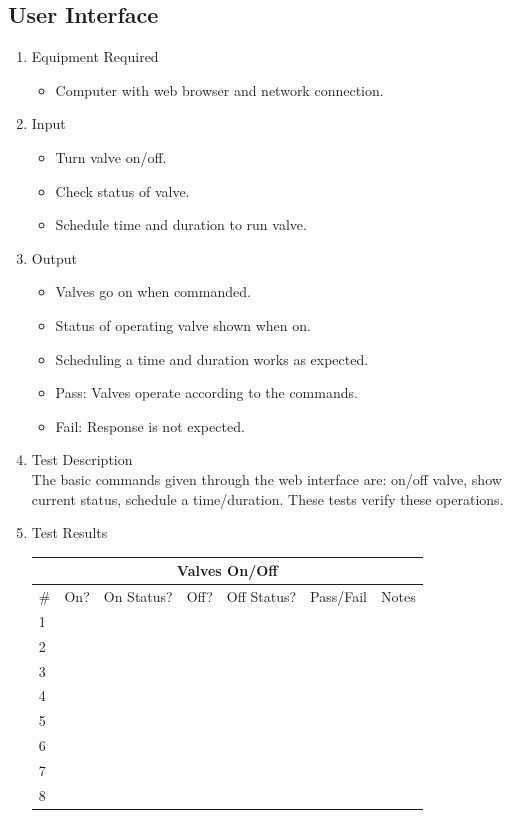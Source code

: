 \documentclass{article}
\begin{document}

\clearpage
\subsection{User Interface}

\begin{enumerate}
\item Equipment Required
	\begin{itemize}
	\item Computer with web browser and network connection.
	\end{itemize}
\item Input
	\begin{itemize}
	\item Turn valve on/off.
	\item Check status of valve.
	\item Schedule time and duration to run valve.
	\end{itemize}
\item Output
	\begin{itemize}
	\item Valves go on when commanded.
	\item Status of operating valve shown when on.
	\item Scheduling a time and duration works as expected.
	\item Pass: Valves operate according to the commands.
	\item Fail: Response is not expected.
	\end{itemize}
\item Test Description \\

The basic commands given through the web interface are:
on/off valve, show current status, schedule a time/duration.
These tests verify these operations.

\item Test Results \\
	\vspace{0.25in}
	\begin{tabular}{|l|l|l|l|l|l|c|}
		\hline
		\multicolumn{7}{|c|}{Valves On/Off} \\
		\hline
		\# & On? & On Status? & Off? & Off Status? & Pass/Fail & \hspace{0.7in}Notes\hspace{0.7in} \\
		\hline
		1 &&&&&& \\
		\hline
		2 &&&&&& \\
		\hline
		3 &&&&&& \\
		\hline
		4 &&&&&& \\
		\hline
		5 &&&&&& \\
		\hline
		6 &&&&&& \\
		\hline
		7 &&&&&& \\
		\hline
		8 &&&&&& \\
		\hline
	\end{tabular}


\end{enumerate}
\end{document}
